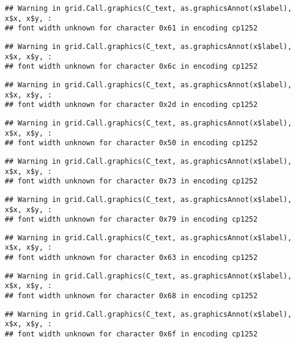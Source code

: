 \documentclass[
]{article}
\begin{document}
\begin{verbatim}
## Warning in grid.Call.graphics(C_text, as.graphicsAnnot(x$label), x$x, x$y, :
## font width unknown for character 0x61 in encoding cp1252
\end{verbatim}

\begin{verbatim}
## Warning in grid.Call.graphics(C_text, as.graphicsAnnot(x$label), x$x, x$y, :
## font width unknown for character 0x6c in encoding cp1252
\end{verbatim}

\begin{verbatim}
## Warning in grid.Call.graphics(C_text, as.graphicsAnnot(x$label), x$x, x$y, :
## font width unknown for character 0x2d in encoding cp1252
\end{verbatim}

\begin{verbatim}
## Warning in grid.Call.graphics(C_text, as.graphicsAnnot(x$label), x$x, x$y, :
## font width unknown for character 0x50 in encoding cp1252
\end{verbatim}

\begin{verbatim}
## Warning in grid.Call.graphics(C_text, as.graphicsAnnot(x$label), x$x, x$y, :
## font width unknown for character 0x73 in encoding cp1252
\end{verbatim}

\begin{verbatim}
## Warning in grid.Call.graphics(C_text, as.graphicsAnnot(x$label), x$x, x$y, :
## font width unknown for character 0x79 in encoding cp1252
\end{verbatim}

\begin{verbatim}
## Warning in grid.Call.graphics(C_text, as.graphicsAnnot(x$label), x$x, x$y, :
## font width unknown for character 0x63 in encoding cp1252
\end{verbatim}

\begin{verbatim}
## Warning in grid.Call.graphics(C_text, as.graphicsAnnot(x$label), x$x, x$y, :
## font width unknown for character 0x68 in encoding cp1252
\end{verbatim}

\begin{verbatim}
## Warning in grid.Call.graphics(C_text, as.graphicsAnnot(x$label), x$x, x$y, :
## font width unknown for character 0x6f in encoding cp1252
\end{verbatim}
\end{document}
